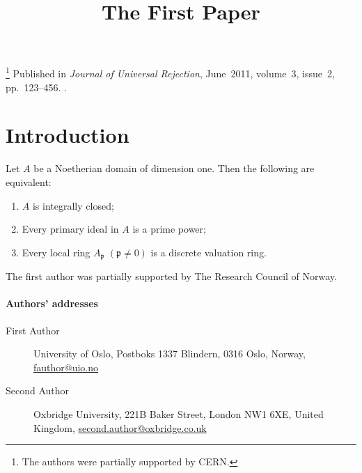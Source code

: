 \title{The First Paper}
\thanks{The authors were partially supported by CERN.}
\metadata
{
    Published in \emph{Journal of Universal Rejection},
    June~2011,
    volume~3,
    issue~2,
    pp.~123--456.
    .
}
\maketitle
\label{pap:first}

\begin{abstract}
\end{abstract}

\startcontents[chapters]

\section{Introduction}


\begin{theorem}[{\cite[95]{AM69}}]
    \label{thm:dedekind}
    Let \( A \) be a Noetherian domain of dimension one. Then the following are equivalent:
    \begin{enumerate}
        \item
        \( A \) is integrally closed;

        \item
        Every primary ideal in \( A \) is a prime power;

        \item
        Every local ring \( A_\mathfrak{p} \) \( (\mathfrak{p} \neq 0) \) is a discrete valuation ring.
    \end{enumerate}
\end{theorem}

\begin{acknowledgements}
    The first author was partially supported by The Research Council of Norway.
\end{acknowledgements}

\stopcontents[chapters]

\paragraph{Authors' addresses}
\begin{description}
    \item[First Author]
    University of Oslo,
    Postboks 1337 Blindern, 0316 Oslo, Norway,
    \href{mailto:fauthor@uio.no}{fauthor@uio.no}

    \item[Second Author]
    Oxbridge University,
    221B Baker Street, London NW1 6XE, United Kingdom,
    \href{mailto:second.author@oxbridge.co.uk}{second.author@oxbridge.co.uk}
\end{description}